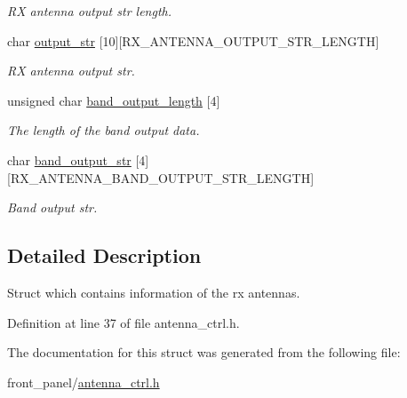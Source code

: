 \begin{CompactItemize}
\begin{CompactList}\small\item\em RX antenna output str length. \item\end{CompactList}\item 
\hypertarget{structstruct__rx__antennas_f3b3fd1eaa56577da2ebf64f6d2447ff}{
char \hyperlink{structstruct__rx__antennas_f3b3fd1eaa56577da2ebf64f6d2447ff}{output\_\-str} \mbox{[}10\mbox{]}\mbox{[}RX\_\-ANTENNA\_\-OUTPUT\_\-STR\_\-LENGTH\mbox{]}}
\label{structstruct__rx__antennas_f3b3fd1eaa56577da2ebf64f6d2447ff}

\begin{CompactList}\small\item\em RX antenna output str. \item\end{CompactList}\item 
\hypertarget{structstruct__rx__antennas_1e5f0df95e4e64903fac2f321da60f3c}{
unsigned char \hyperlink{structstruct__rx__antennas_1e5f0df95e4e64903fac2f321da60f3c}{band\_\-output\_\-length} \mbox{[}4\mbox{]}}
\label{structstruct__rx__antennas_1e5f0df95e4e64903fac2f321da60f3c}

\begin{CompactList}\small\item\em The length of the band output data. \item\end{CompactList}\item 
\hypertarget{structstruct__rx__antennas_ea9e148365c5a9685db588c08398299d}{
char \hyperlink{structstruct__rx__antennas_ea9e148365c5a9685db588c08398299d}{band\_\-output\_\-str} \mbox{[}4\mbox{]}\mbox{[}RX\_\-ANTENNA\_\-BAND\_\-OUTPUT\_\-STR\_\-LENGTH\mbox{]}}
\label{structstruct__rx__antennas_ea9e148365c5a9685db588c08398299d}

\begin{CompactList}\small\item\em Band output str. \item\end{CompactList}\end{CompactItemize}


\subsection{Detailed Description}
Struct which contains information of the rx antennas. 

Definition at line 37 of file antenna\_\-ctrl.h.

The documentation for this struct was generated from the following file:\begin{CompactItemize}
\item 
front\_\-panel/\hyperlink{antenna__ctrl_8h}{antenna\_\-ctrl.h}\end{CompactItemize}
